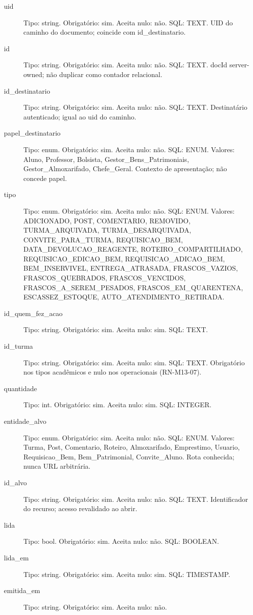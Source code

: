 \begin{description}
\item[uid] Tipo: string. Obrigatório: sim. Aceita nulo: não.
SQL: TEXT.
UID do caminho do documento; coincide com id\_destinatario.
\item[id] Tipo: string. Obrigatório: sim. Aceita nulo: não.
SQL: TEXT.
docId server-owned; não duplicar como contador relacional.
\item[id\_destinatario] Tipo: string. Obrigatório: sim. Aceita nulo: não.
SQL: TEXT.
Destinatário autenticado; igual ao uid do caminho.
\item[papel\_destinatario] Tipo: enum. Obrigatório: sim. Aceita nulo: não.
SQL: ENUM.
Valores: Aluno, Professor, Bolsista, Gestor\_Bens\_Patrimoniais, Gestor\_Almoxarifado, Chefe\_Geral.
Contexto de apresentação; não concede papel.
\item[tipo] Tipo: enum. Obrigatório: sim. Aceita nulo: não.
SQL: ENUM.
Valores: ADICIONADO, POST, COMENTARIO, REMOVIDO, TURMA\_ARQUIVADA, TURMA\_DESARQUIVADA, CONVITE\_PARA\_TURMA, REQUISICAO\_BEM, DATA\_DEVOLUCAO\_REAGENTE, ROTEIRO\_COMPARTILHADO, REQUISICAO\_EDICAO\_BEM, REQUISICAO\_ADICAO\_BEM, BEM\_INSERVIVEL, ENTREGA\_ATRASADA, FRASCOS\_VAZIOS, FRASCOS\_QUEBRADOS, FRASCOS\_VENCIDOS, FRASCOS\_A\_SEREM\_PESADOS, FRASCOS\_EM\_QUARENTENA, ESCASSEZ\_ESTOQUE, AUTO\_ATENDIMENTO\_RETIRADA.
\item[id\_quem\_fez\_acao] Tipo: string. Obrigatório: sim. Aceita nulo: sim.
SQL: TEXT.
\item[id\_turma] Tipo: string. Obrigatório: sim. Aceita nulo: sim.
SQL: TEXT.
Obrigatório nos tipos acadêmicos e nulo nos operacionais (RN-M13-07).
\item[quantidade] Tipo: int. Obrigatório: sim. Aceita nulo: sim.
SQL: INTEGER.
\item[entidade\_alvo] Tipo: enum. Obrigatório: sim. Aceita nulo: não.
SQL: ENUM.
Valores: Turma, Post, Comentario, Roteiro, Almoxarifado, Emprestimo, Usuario, Requisicao\_Bem, Bem\_Patrimonial, Convite\_Aluno.
Rota conhecida; nunca URL arbitrária.
\item[id\_alvo] Tipo: string. Obrigatório: sim. Aceita nulo: não.
SQL: TEXT.
Identificador do recurso; acesso revalidado ao abrir.
\item[lida] Tipo: bool. Obrigatório: sim. Aceita nulo: não.
SQL: BOOLEAN.
\item[lida\_em] Tipo: string. Obrigatório: sim. Aceita nulo: sim.
SQL: TIMESTAMP.
\item[emitida\_em] Tipo: string. Obrigatório: sim. Aceita nulo: não.

\end{description}
